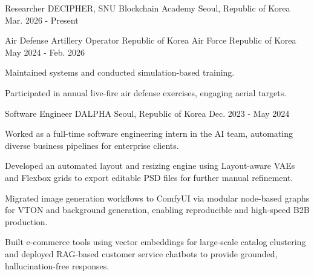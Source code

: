 

\begin{cventries}

  \cventry
    {Researcher} %
    {DECIPHER, SNU Blockchain Academy} %
    {Seoul, Republic of Korea} %
    {Mar. 2026 - Present} %
    {
    }

  \cventry
    {Air Defense Artillery Operator} %
    {Republic of Korea Air Force} %
    {Republic of Korea} %
    {May 2024 - Feb. 2026} %
    {
      \begin{cvitems} %
        \item {Maintained systems and conducted simulation-based training.}
        \item {Participated in annual live-fire air defense exercises, engaging aerial targets.}
      \end{cvitems}
    }

  \cventry
    {Software Engineer} %
    {DALPHA} %
    {Seoul, Republic of Korea} %
    {Dec. 2023 - May 2024} %
    {
      \begin{cvitems} %
        \item {Worked as a full-time software engineering intern in the AI team, automating diverse business pipelines for enterprise clients.}
        \item {Developed an automated layout and resizing engine using Layout-aware VAEs and Flexbox grids to export editable PSD files for further manual refinement.}
        \item {Migrated image generation workflows to ComfyUI via modular node-based graphs for VTON and background generation, enabling reproducible and high-speed B2B production.}
        \item {Built e-commerce tools using vector embeddings for large-scale catalog clustering and deployed RAG-based customer service chatbots to provide grounded, hallucination-free responses.}
      \end{cvitems}
    }

\end{cventries}
